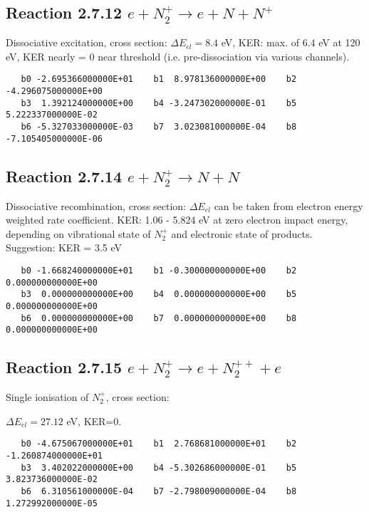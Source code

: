 \documentclass[12pt,dvipdfmx]{article}
\begin{document}
\subsection{
Reaction 2.7.12  $e + N_2^+ \rightarrow e + N + N^+ $ }
Dissociative excitation, cross section:
\cite{kn:Bahati}
$\Delta E_{el} = 8.4 $ eV, KER: max. of 6.4 eV at 120 eV, KER nearly = 0 near threshold (i.e.
pre-dissociation via various channels).

\begin{small}\begin{verbatim}
   b0 -2.695366000000E+01    b1  8.978136000000E+00    b2 -4.296075000000E+00
   b3  1.392124000000E+00    b4 -3.247302000000E-01    b5  5.222337000000E-02
   b6 -5.327033000000E-03    b7  3.023081000000E-04    b8 -7.105405000000E-06
\end{verbatim}\end{small}

\subsection{
Reaction 2.7.14  $e + N_2^+ \rightarrow N + N$ }
Dissociative recombination, cross section:
\cite{kn:Petersen}
$\Delta E_{el}$ can be taken from electron energy weighted rate coefficient. KER: 1.06 - 5.824 eV at zero electron impact energy,
depending on vibrational state of $N_2^+$ and electronic state of products. Suggestion: KER = 3.5 eV

\begin{small}\begin{verbatim}
   b0 -1.668240000000E+01    b1 -0.300000000000E+00    b2  0.000000000000E+00
   b3  0.000000000000E+00    b4  0.000000000000E+00    b5  0.000000000000E+00
   b6  0.000000000000E+00    b7  0.000000000000E+00    b8  0.000000000000E+00
\end{verbatim}\end{small}



\subsection{
Reaction 2.7.15  $e + N_2^+ \rightarrow e + N_2^{++} +e$ }
Single ionisation of $N_2^+$, cross section: \cite{kn:Bahati}

$\Delta E_{el} = 27.12 $ eV,  KER=0.

\begin{small}\begin{verbatim}
   b0 -4.675067000000E+01    b1  2.768681000000E+01    b2 -1.260874000000E+01
   b3  3.402022000000E+00    b4 -5.302686000000E-01    b5  3.823736000000E-02
   b6  6.310561000000E-04    b7 -2.798009000000E-04    b8  1.272992000000E-05
\end{verbatim}\end{small}
\end{document}
